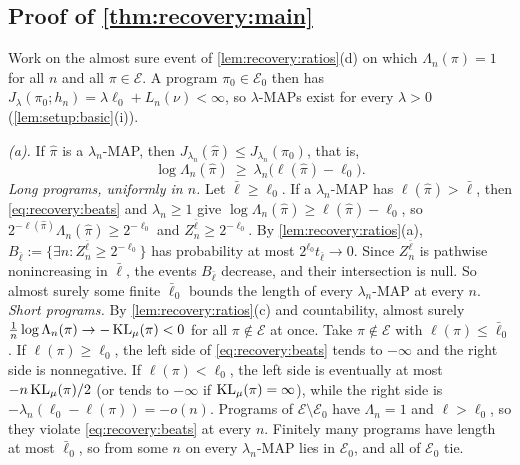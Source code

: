 \subsection{Proof of \texorpdfstring{\cref{thm:recovery:main}}{Theorem \ref*{thm:recovery:main}}}\label{app:recovery:main}

Work on the almost sure event of \cref{lem:recovery:ratios}(d) on which $\Lambda_n(\pi)=1$ for all $n$ and all $\pi\in\mathcal E$. A program $\pi_0\in\mathcal E_0$ then has $J_\lambda(\pi_0;h_n)=\lambda\ell_0+L_n(\nu)<\infty$, so $\lambda$-MAPs exist for every $\lambda>0$ (\cref{lem:setup:basic}(i)).

\emph{(a).} If $\hat\pi$ is a $\lambda_n$-MAP, then $J_{\lambda_n}(\hat\pi)\le J_{\lambda_n}(\pi_0)$, that is,
\begin{equation}\label{eq:recovery:beats}
\log\Lambda_n(\hat\pi)\ \ge\ \lambda_n\big(\ell(\hat\pi)-\ell_0\big).
\end{equation}
\emph{Long programs, uniformly in $n$.} Let $\bar\ell\ge\ell_0$. If a $\lambda_n$-MAP has $\ell(\hat\pi)>\bar\ell$, then \eqref{eq:recovery:beats} and $\lambda_n\ge1$ give $\log\Lambda_n(\hat\pi)\ge\ell(\hat\pi)-\ell_0$, so $2^{-\ell(\hat\pi)}\Lambda_n(\hat\pi)\ge2^{-\ell_0}$ and $Z^{\bar\ell}_n\ge2^{-\ell_0}$. By \cref{lem:recovery:ratios}(a), $B_{\bar\ell}:=\{\exists n:Z^{\bar\ell}_n\ge2^{-\ell_0}\}$ has probability at most $2^{\ell_0}t_{\bar\ell}\to0$. Since $Z^{\bar\ell}_n$ is pathwise nonincreasing in $\bar\ell$, the events $B_{\bar\ell}$ decrease, and their intersection is null. So almost surely some finite $\bar\ell_0$ bounds the length of every $\lambda_n$-MAP at every $n$.
\emph{Short programs.} By \cref{lem:recovery:ratios}(c) and countability, almost surely $\frac1n\log\Lambda_n(\pi)\to-\operatorname{KL}_\mu(\pi)<0$ for all $\pi\notin\mathcal E$ at once. Take $\pi\notin\mathcal E$ with $\ell(\pi)\le\bar\ell_0$. If $\ell(\pi)\ge\ell_0$, the left side of \eqref{eq:recovery:beats} tends to $-\infty$ and the right side is nonnegative. If $\ell(\pi)<\ell_0$, the left side is eventually at most $-n\operatorname{KL}_\mu(\pi)/2$ (or tends to $-\infty$ if $\operatorname{KL}_\mu(\pi)=\infty$), while the right side is $-\lambda_n(\ell_0-\ell(\pi))=-o(n)$. Programs of $\mathcal E\setminus\mathcal E_0$ have $\Lambda_n=1$ and $\ell>\ell_0$, so they violate \eqref{eq:recovery:beats} at every $n$. Finitely many programs have length at most $\bar\ell_0$, so from some $n$ on every $\lambda_n$-MAP lies in $\mathcal E_0$, and all of $\mathcal E_0$ tie.


